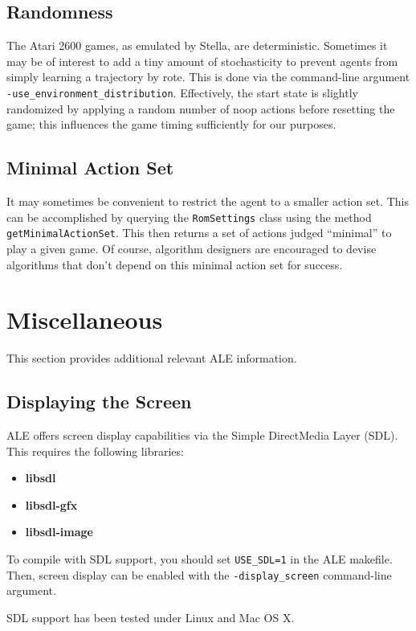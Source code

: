 \documentclass[12pt]{article}
\begin{document}
\subsection{Randomness}

The Atari 2600 games, as emulated by Stella, are deterministic. Sometimes it may be of interest
to add a tiny amount of stochasticity to prevent agents from simply learning a trajectory by
rote. This is done via the command-line argument \verb+-use_environment_distribution+. Effectively,
the start state is slightly randomized by applying a random number of noop actions before
resetting the game; this influences the game timing sufficiently for our purposes.

\subsection{Minimal Action Set}

It may sometimes be convenient to restrict the agent to a smaller action set. This can be
accomplished by querying the \verb+RomSettings+ class using the method 
\verb+getMinimalActionSet+. This then returns a set of actions judged ``minimal'' to play a given
game. Of course, algorithm designers are encouraged to devise algorithms that don't depend 
on this minimal action set for success.

\section{Miscellaneous}

This section provides additional relevant ALE information.

\subsection{Displaying the Screen}

ALE offers screen display capabilities via the Simple DirectMedia Layer (SDL). This requires
the following libraries:

\begin{itemize}
  \item{\textbf{libsdl}}
  \item{\textbf{libsdl-gfx}}
  \item{\textbf{libsdl-image}}
\end{itemize}

To compile with SDL support, you should set \verb+USE_SDL=1+ in the ALE makefile. Then, screen
display can be enabled with the \verb+-display_screen+ command-line argument. 

SDL support has been tested under Linux and Mac OS X. 
\end{document}
